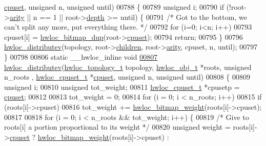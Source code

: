 \begin{DoxyCode}
      \hyperlink{a00016_a67925e0f2c47f50408fbdb9bddd0790f}{cpuset}, \textcolor{keywordtype}{unsigned} n, \textcolor{keywordtype}{unsigned} until)
00788 \{
00789   \textcolor{keywordtype}{unsigned} i;
00790   \textcolor{keywordflow}{if} (!root->\hyperlink{a00016_aac3f6da35c9b57599909a44ce2b716c1}{arity} || n == 1 || root->\hyperlink{a00016_a9d82690370275d42d652eccdea5d3ee5}{depth} >= until) \{
00791     \textcolor{comment}{/* Got to the bottom, we can't split any more, put everything there.  */}
00792     \textcolor{keywordflow}{for} (i=0; i<n; i++)
00793       cpuset[i] = \hyperlink{a00065_gaaa4ed76211cd3694dfbea2109fc440be}{hwloc_bitmap_dup}(root->\hyperlink{a00016_a67925e0f2c47f50408fbdb9bddd0790f}{cpuset});
00794     \textcolor{keywordflow}{return};
00795   \}
00796   \hyperlink{a00059_gaf057d7c5e3cb3df897ce527258537619}{hwloc_distributev}(topology, root->\hyperlink{a00016_a04d05403da37bfe17cd63b7c7dd07b1f}{children}, root->\hyperlink{a00016_aac3f6da35c9b57599909a44ce2b716c1}{arity}, cpuset, n, until);
00797 \}
00798 
00806 \textcolor{keyword}{static} \_\_hwloc\_inline \textcolor{keywordtype}{void}
\hypertarget{a00031_source_l00807}{}\hyperlink{a00059_gaf057d7c5e3cb3df897ce527258537619}{00807} \hyperlink{a00059_gaf057d7c5e3cb3df897ce527258537619}{hwloc_distributev}(\hyperlink{a00039_ga9d1e76ee15a7dee158b786c30b6a6e38}{hwloc_topology_t} topology, \hyperlink{a00016}{hwloc_obj_t} *roots, \textcolor{keywordtype}{unsigned} n\_roots
      , \hyperlink{a00040_ga4bbf39b68b6f568fb92739e7c0ea7801}{hwloc_cpuset_t} *\hyperlink{a00016_a67925e0f2c47f50408fbdb9bddd0790f}{cpuset}, \textcolor{keywordtype}{unsigned} n, \textcolor{keywordtype}{unsigned} until)
00808 \{
00809   \textcolor{keywordtype}{unsigned} i;
00810   \textcolor{keywordtype}{unsigned} tot\_weight;
00811   \hyperlink{a00040_ga4bbf39b68b6f568fb92739e7c0ea7801}{hwloc_cpuset_t} *cpusetp = \hyperlink{a00016_a67925e0f2c47f50408fbdb9bddd0790f}{cpuset};
00812 
00813   tot\_weight = 0;
00814   \textcolor{keywordflow}{for} (i = 0; i < n\_roots; i++)
00815     \textcolor{keywordflow}{if} (roots[i]->cpuset)
00816       tot\_weight += \hyperlink{a00065_ga12d520387be74f849f191d7a06ac325c}{hwloc_bitmap_weight}(roots[i]->cpuset);
00817 
00818   \textcolor{keywordflow}{for} (i = 0; i < n\_roots && tot\_weight; i++) \{
00819     \textcolor{comment}{/* Give to roots[i] a portion proportional to its weight */}
00820     \textcolor{keywordtype}{unsigned} weight = roots[i]->\hyperlink{a00016_a67925e0f2c47f50408fbdb9bddd0790f}{cpuset} ? \hyperlink{a00065_ga12d520387be74f849f191d7a06ac325c}{hwloc_bitmap_weight}(roots[i]->cpuset) : 

\end{DoxyCode}
